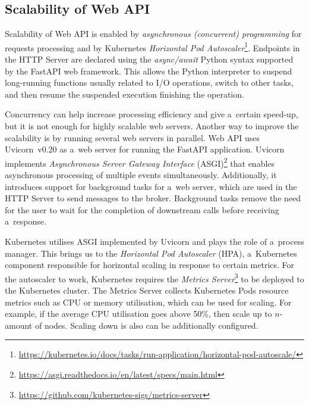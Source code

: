 \documentclass[12pt]{article}
\begin{document}
\subsection{Scalability of Web API} \label{ch:scalability_of_web_api}

Scalability of Web API is enabled by \emph{asynchronous (concurrent) programming} for requests processing and by Kubernetes \emph{Horizontal Pod Autoscaler}\footnote{\href{https://kubernetes.io/docs/tasks/run-application/horizontal-pod-autoscale/}{https://kubernetes.io/docs/tasks/run-application/horizontal-pod-autoscale/}}. Endpoints in the HTTP Server are declared using the \emph{async/await} Python syntax supported by the FastAPI web framework. This allows the Python interpreter to suspend long-running functions usually related to I/O operations, switch to other tasks, and then resume the suspended execution finishing the operation.

Concurrency can help increase processing efficiency and give a~certain speed-up, but it is not enough for highly scalable web servers. Another way to improve the scalability is by running several web servers in parallel. Web API uses Uvicorn~v0.20 as a~web server for running the FastAPI application. Uvicorn implements \emph{Asynchronous Server Gateway Interface} (ASGI)\footnote{\href{https://asgi.readthedocs.io/en/latest/specs/main.html}{https://asgi.readthedocs.io/en/latest/specs/main.html}} that enables asynchronous processing of multiple events simultaneously. Additionally, it introduces support for background tasks for a~web server, which are used in the HTTP Server to send messages to the broker. Background tasks remove the need for the user to wait for the completion of downstream calls before receiving a~response.

Kubernetes utilises ASGI implemented by Uvicorn and plays the role of a~process manager. This brings us to the \emph{Horizontal Pod Autoscaler} (HPA), a~Kubernetes component responsible for horizontal scaling in response to certain metrics. For the autoscaler to work, Kubernetes requires the \emph{Metrics Server}\footnote{\href{https://github.com/kubernetes-sigs/metrics-server}{https://github.com/kubernetes-sigs/metrics-server}} to be deployed to the Kubernetes cluster. The Metrics Server collects Kubernetes Pods resource metrics such as CPU or memory utilisation, which can be used for scaling. For example, if the average CPU utilisation goes above 50\%, then scale up to $n$-amount of nodes. Scaling down is also can be additionally configured. 
\end{document}
